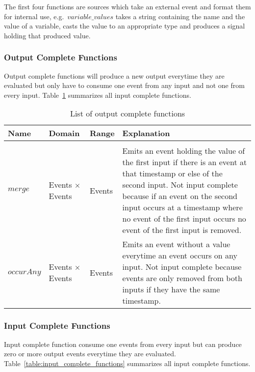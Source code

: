 The first four functions are sources which take an external event and format them for internal use, e.g.\ \(\mathit{variable\_values}\) takes a string containing the name and the value of a variable, casts the value to an appropriate type and produces a signal holding that produced value.

\subsubsection{Output Complete Functions}

Output complete functions will produce a new output everytime they are evaluated but only have to consume one event from any input and not one from every input.
Table~\ref{table:output_complete_functions} summarizes all input complete functions.

\begin{table}[htb]
  \begin{tabularx}{\textwidth}{lllX}
    Name                 & Domain        & Range   & Explanation \\
    \toprule \\
    \(\mathit{merge}\)            & Events \(\times\) Events  & Events  & Emits an event holding the value of the first input if there is an event at that timestamp or else of the second input. Not input complete because if an event on the second input occurs at a timestamp where no event of the first input occurs no event of the first input is removed. \\
    \(\mathit{occurAny}\)         & Events \(\times\) Events  & Events  & Emits an event without a value everytime an event occurs on any input. Not input complete because events are only removed from both inputs if they have the same timestamp. \\
  \end{tabularx}
\caption{List of output complete functions}
\label{table:output_complete_functions}
\end{table}


\subsubsection{Input Complete Functions}

Input complete function consume one events from every input but can produce zero or more output events everytime they are evaluated.
Table~\ref{table:input_complete_functions} summarizes all input complete functions.


